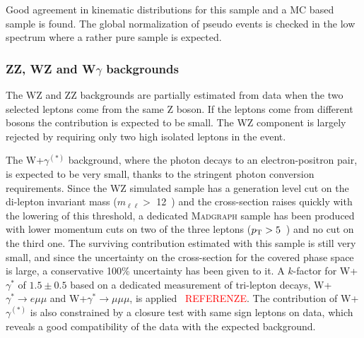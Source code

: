 Good agreement in kinematic distributions for this sample
and a MC based \dytt sample is found.
The global normalization of pseudo \dytt events is 
checked in the low \mt spectrum where a rather pure
\dytt sample is expected.


	\subsubsection{ZZ, WZ and W\texorpdfstring{$\gamma$}{gamma} backgrounds\label{sec:otherbkg}}

The WZ and ZZ backgrounds are partially estimated from data when the two
selected leptons come from the same Z boson. If the leptons come from different
bosons the contribution is expected to be small. The WZ component is largely
rejected by requiring only two high \pt isolated leptons in the event. 

The W+$\gamma^{(*)}$ background, where the photon decays to an electron-positron pair,
is expected to be very small, thanks to the stringent photon conversion
requirements.
 Since the WZ simulated sample has a generation level cut on the
di-lepton invariant mass ($m_{\ell\ell} >$ 12~\GeV) and the cross-section raises
quickly with the lowering of this threshold, a dedicated \textsc{Madgraph} sample has
been produced with lower momentum cuts on two of the three leptons
($p_\mathrm{T} > 5$~\GeV) and no cut on the third one. The surviving contribution
estimated with this sample is still very small, and since the uncertainty on the
cross-section for the covered phase space is large, a conservative 100\%
uncertainty has been given to it. 
A $k$-factor for W+$\gamma^{*}$ of $1.5\pm0.5$ based on a dedicated measurement of 
tri-lepton decays, W+$\gamma^{*} \to e\mu\mu$ and W+$\gamma^{*} \to \mu\mu\mu$,
is applied~\cite{WGammaStarStudy} \textcolor{red}{REFERENZE}. 
The contribution of W+$\gamma^{(*)}$ is also
constrained by a closure test with same sign leptons on data, which reveals a
good compatibility of the data with the expected background.

